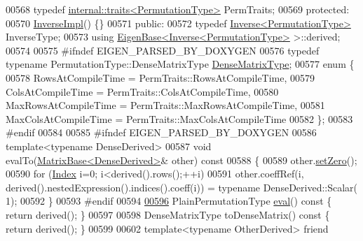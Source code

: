 \begin{DoxyCode}
00568     \textcolor{keyword}{typedef} \hyperlink{struct_eigen_1_1internal_1_1traits}{internal::traits<PermutationType>} PermTraits;
00569   \textcolor{keyword}{protected}:
00570     \hyperlink{class_eigen_1_1_inverse_impl}{InverseImpl}() \{\}
00571   \textcolor{keyword}{public}:
00572     \textcolor{keyword}{typedef} \hyperlink{class_eigen_1_1_inverse}{Inverse<PermutationType>} InverseType;
00573     \textcolor{keyword}{using} \hyperlink{group___core___module_struct_eigen_1_1_eigen_base}{EigenBase<Inverse<PermutationType>} >::derived;
00574 
00575 \textcolor{preprocessor}{    #ifndef EIGEN\_PARSED\_BY\_DOXYGEN}
00576     \textcolor{keyword}{typedef} \textcolor{keyword}{typename} PermutationType::DenseMatrixType \hyperlink{group___core___module_class_eigen_1_1_matrix}{DenseMatrixType};
00577     \textcolor{keyword}{enum} \{
00578       RowsAtCompileTime = PermTraits::RowsAtCompileTime,
00579       ColsAtCompileTime = PermTraits::ColsAtCompileTime,
00580       MaxRowsAtCompileTime = PermTraits::MaxRowsAtCompileTime,
00581       MaxColsAtCompileTime = PermTraits::MaxColsAtCompileTime
00582     \};
00583 \textcolor{preprocessor}{    #endif}
00584 
00585 \textcolor{preprocessor}{    #ifndef EIGEN\_PARSED\_BY\_DOXYGEN}
00586     \textcolor{keyword}{template}<\textcolor{keyword}{typename} DenseDerived>
00587     \textcolor{keywordtype}{void} evalTo(\hyperlink{group___core___module_class_eigen_1_1_matrix_base}{MatrixBase<DenseDerived>}& other)\textcolor{keyword}{ const}
00588 \textcolor{keyword}{    }\{
00589       other.\hyperlink{group___core___module_ac74411ddeea2545bf20baf14613be47e}{setZero}();
00590       \textcolor{keywordflow}{for} (\hyperlink{group___core___module_a554f30542cc2316add4b1ea0a492ff02}{Index} i=0; i<derived().rows();++i)
00591         other.coeffRef(i, derived().nestedExpression().indices().coeff(i)) = \textcolor{keyword}{typename} DenseDerived::Scalar(
      1);
00592     \}
00593 \textcolor{preprocessor}{    #endif}
00594 
\hyperlink{class_eigen_1_1_inverse_impl_3_01_permutation_type_00_01_permutation_storage_01_4_a9048319f60dc98831ddfd25a5f7d69a7}{00596}     PlainPermutationType \hyperlink{class_eigen_1_1_inverse_impl_3_01_permutation_type_00_01_permutation_storage_01_4_a9048319f60dc98831ddfd25a5f7d69a7}{eval}()\textcolor{keyword}{ const }\{ \textcolor{keywordflow}{return} derived(); \}
00597 
00598     DenseMatrixType toDenseMatrix()\textcolor{keyword}{ const }\{ \textcolor{keywordflow}{return} derived(); \}
00599 
00602     \textcolor{keyword}{template}<\textcolor{keyword}{typename} OtherDerived> \textcolor{keyword}{friend}

\end{DoxyCode}
